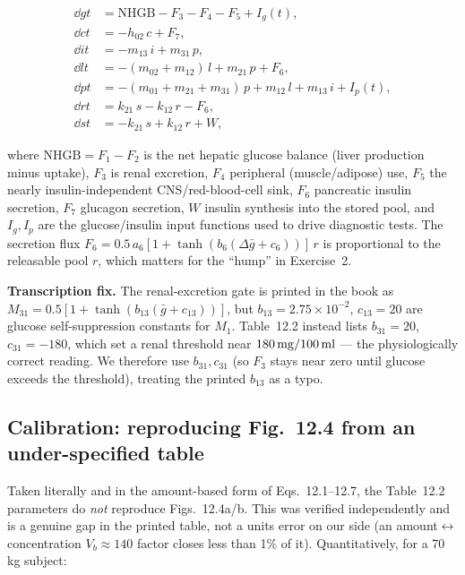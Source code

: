 \begin{align}
\dd{g}{t} &= \mathrm{NHGB} - F_3 - F_4 - F_5 + I_g(t), \\
\dd{c}{t} &= -h_{02}\,c + F_7, \\
\dd{i}{t} &= -m_{13}\,i + m_{31}\,p, \\
\dd{l}{t} &= -(m_{02}+m_{12})\,l + m_{21}\,p + F_6, \\
\dd{p}{t} &= -(m_{01}+m_{21}+m_{31})\,p + m_{12}\,l + m_{13}\,i + I_p(t), \\
\dd{r}{t} &= k_{21}\,s - k_{12}\,r - F_6, \\
\dd{s}{t} &= -k_{21}\,s + k_{12}\,r + W,
\end{align}

where $\mathrm{NHGB}=F_1-F_2$ is the net hepatic glucose balance (liver production minus uptake),
$F_3$ is renal excretion, $F_4$ peripheral (muscle/adipose) use, $F_5$ the nearly
insulin-independent CNS/red-blood-cell sink, $F_6$ pancreatic insulin secretion, $F_7$ glucagon
secretion, $W$ insulin synthesis into the stored pool, and $I_g,I_p$ are the glucose/insulin input
functions used to drive diagnostic tests. The secretion flux
$F_6=0.5\,a_6[1+\tanh(b_6(\Delta\bar{g}+c_6))]\,r$ is proportional to the releasable pool $r$, which
matters for the ``hump'' in Exercise~2.

\textbf{Transcription fix.} The renal-excretion gate is printed in the book as
$M_{31}=0.5[1+\tanh(b_{13}(\bar{g}+c_{13}))]$, but $b_{13}=2.75\times10^{-2}$, $c_{13}=20$ are glucose
self-suppression constants for $M_1$. Table~12.2 instead lists $b_{31}=20$, $c_{31}=-180$, which set a
renal threshold near $180\,\mathrm{mg}/100\,\mathrm{ml}$ --- the physiologically correct reading. We therefore use
$b_{31},c_{31}$ (so $F_3$ stays near zero until glucose exceeds the threshold), treating the printed
$b_{13}$ as a typo.

\subsection{Calibration: reproducing Fig.~12.4 from an under-specified table}
\label{sec:calibration}

Taken literally and in the amount-based form of Eqs.~12.1--12.7, the Table~12.2 parameters do
\emph{not} reproduce Figs.~12.4a/b. This was verified independently and is a genuine gap in the
printed table, not a units error on our side (an amount$\leftrightarrow$concentration $V_b\approx140$
factor closes less than 1\% of it). Quantitatively, for a 70\,kg subject:

